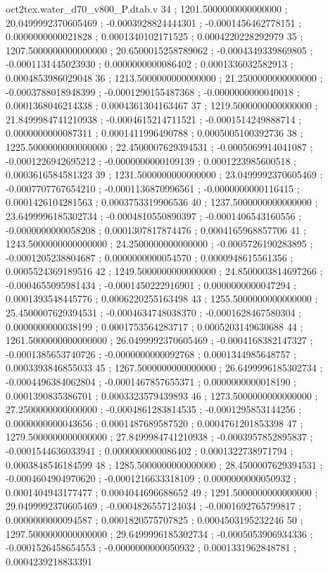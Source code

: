\begin{filecontents}[overwrite]{oct2tex.water_d70_v800_P.dtab.v}
34 ; 1201.5000000000000000 ; 20.0499992370605469 ; -0.0003928824444301 ; -0.0001456462778151 ; 0.0000000000021828 ; 0.0001340102171525 ; 0.0004220228292979
35 ; 1207.5000000000000000 ; 20.6500015258789062 ; -0.0004349339869805 ; -0.0001131445023930 ; 0.0000000000086402 ; 0.0001336032582913 ; 0.0004853986029048
36 ; 1213.5000000000000000 ; 21.2500000000000000 ; -0.0003788018948399 ; -0.0001290155487368 ; -0.0000000000040018 ; 0.0001368046214338 ; 0.0004361304163467
37 ; 1219.5000000000000000 ; 21.8499984741210938 ; -0.0004615214711521 ; -0.0001514249888714 ; 0.0000000000087311 ; 0.0001411996490788 ; 0.0005005100392736
38 ; 1225.5000000000000000 ; 22.4500007629394531 ; -0.0005069914041087 ; -0.0001226942695212 ; -0.0000000000109139 ; 0.0001223985600518 ; 0.0003616584581323
39 ; 1231.5000000000000000 ; 23.0499992370605469 ; -0.0007707767654210 ; -0.0001136870996561 ; -0.0000000000116415 ; 0.0001426104281563 ; 0.0003753319906536
40 ; 1237.5000000000000000 ; 23.6499996185302734 ; -0.0004810550890397 ; -0.0001406543160556 ; -0.0000000000058208 ; 0.0001307817874476 ; 0.0004165968857706
41 ; 1243.5000000000000000 ; 24.2500000000000000 ; -0.0005726190283895 ; -0.0001205238804687 ; 0.0000000000054570 ; 0.0000948615561356 ; 0.0005524369189516
42 ; 1249.5000000000000000 ; 24.8500003814697266 ; -0.0004655095981434 ; -0.0001450222916901 ; 0.0000000000047294 ; 0.0001393548445776 ; 0.0006220255163498
43 ; 1255.5000000000000000 ; 25.4500007629394531 ; -0.0004634748038370 ; -0.0001628467580304 ; 0.0000000000038199 ; 0.0001753564283717 ; 0.0005203149630688
44 ; 1261.5000000000000000 ; 26.0499992370605469 ; -0.0004168382147327 ; -0.0001385653740726 ; -0.0000000000092768 ; 0.0001344985648757 ; 0.0003393846855033
45 ; 1267.5000000000000000 ; 26.6499996185302734 ; -0.0004496384062804 ; -0.0001467857655371 ; 0.0000000000018190 ; 0.0001390835386701 ; 0.0003323579439893
46 ; 1273.5000000000000000 ; 27.2500000000000000 ; -0.0004861283814535 ; -0.0001295853144256 ; 0.0000000000043656 ; 0.0001487689587520 ; 0.0004761201853398
47 ; 1279.5000000000000000 ; 27.8499984741210938 ; -0.0003957852895837 ; -0.0001544636033941 ; 0.0000000000086402 ; 0.0001322738971794 ; 0.0003848546184599
48 ; 1285.5000000000000000 ; 28.4500007629394531 ; -0.0004604904970620 ; -0.0001216633318109 ; 0.0000000000050932 ; 0.0001404943177477 ; 0.0004044696688652
49 ; 1291.5000000000000000 ; 29.0499992370605469 ; -0.0004826557124034 ; -0.0001692765799817 ; 0.0000000000094587 ; 0.0001820575707825 ; 0.0004503195232246
50 ; 1297.5000000000000000 ; 29.6499996185302734 ; -0.0005053906934336 ; -0.0001526458654553 ; -0.0000000000050932 ; 0.0001331962848781 ; 0.0004239218833391

\end{filecontents}

